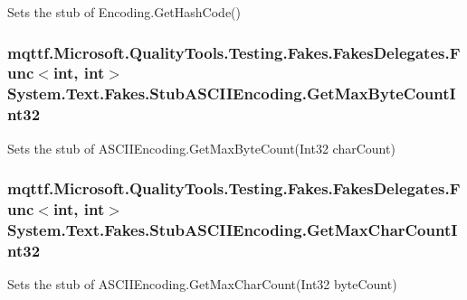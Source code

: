 Sets the stub of Encoding.\-Get\-Hash\-Code()

\hypertarget{class_system_1_1_text_1_1_fakes_1_1_stub_a_s_c_i_i_encoding_a43b17804649a6a80b2a51c9955222c86}{
\subsubsection[{Get\-Max\-Byte\-Count\-Int32}]{\setlength{\rightskip}{0pt plus 5cm}mqttf.\-Microsoft.\-Quality\-Tools.\-Testing.\-Fakes.\-Fakes\-Delegates.\-Func$<$int, int$>$ System.\-Text.\-Fakes.\-Stub\-A\-S\-C\-I\-I\-Encoding.\-Get\-Max\-Byte\-Count\-Int32}}\label{class_system_1_1_text_1_1_fakes_1_1_stub_a_s_c_i_i_encoding_a43b17804649a6a80b2a51c9955222c86}


Sets the stub of A\-S\-C\-I\-I\-Encoding.\-Get\-Max\-Byte\-Count(\-Int32 char\-Count)

\hypertarget{class_system_1_1_text_1_1_fakes_1_1_stub_a_s_c_i_i_encoding_a904c62f592319e264f5c4b40ce0aa736}{
\subsubsection[{Get\-Max\-Char\-Count\-Int32}]{\setlength{\rightskip}{0pt plus 5cm}mqttf.\-Microsoft.\-Quality\-Tools.\-Testing.\-Fakes.\-Fakes\-Delegates.\-Func$<$int, int$>$ System.\-Text.\-Fakes.\-Stub\-A\-S\-C\-I\-I\-Encoding.\-Get\-Max\-Char\-Count\-Int32}}\label{class_system_1_1_text_1_1_fakes_1_1_stub_a_s_c_i_i_encoding_a904c62f592319e264f5c4b40ce0aa736}


Sets the stub of A\-S\-C\-I\-I\-Encoding.\-Get\-Max\-Char\-Count(\-Int32 byte\-Count)

